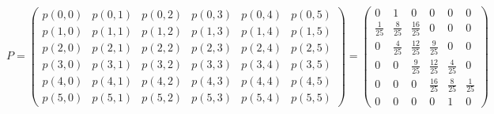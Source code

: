 \documentclass[11pt]{article}
\begin{document}
\begin{problem}
\begin{enumerate}
\begin{solution}
        \[P = \begin{pmatrix}
            p(0,0) &p(0,1) & p(0,2) & p(0,3) & p(0,4) & p(0,5)\\
            p(1,0) & p(1,1) & p(1,2) & p(1,3) & p(1,4) & p(1,5)\\
            p(2,0) & p(2,1) & p(2,2) & p(2,3) & p(2,4) & p(2,5)\\
            p(3,0) & p(3,1) & p(3,2) & p(3,3) & p(3,4) & p(3,5)\\
            p(4,0) & p(4,1) & p(4,2) & p(4,3) & p(4,4) & p(4,5)\\
            p(5,0) & p(5,1) & p(5,2) & p(5,3) & p(5,4) & p(5,5)
        \end{pmatrix} = 
            \begin{pmatrix}
            0 &1 & 0 & 0 & 0 & 0\\
            \frac{1}{25} & \frac{8}{25}& \frac{16}{25} & 0 & 0 & 0\\
            0 & \frac{4}{25}  & \frac{12}{25} & \frac{9}{25} & 0 & 0\\
            0 & 0 & \frac{9}{25} & \frac{12}{25} & \frac{4}{25} &0\\
            0 & 0 & 0 & \frac{16}{25} & \frac{8}{25} & \frac{1}{25}\\
            0 & 0 & 0 & 0 & 1 & 0
        \end{pmatrix}\]
    \end{solution}
\end{enumerate}

\end{problem}

\newpage
\end{document}
